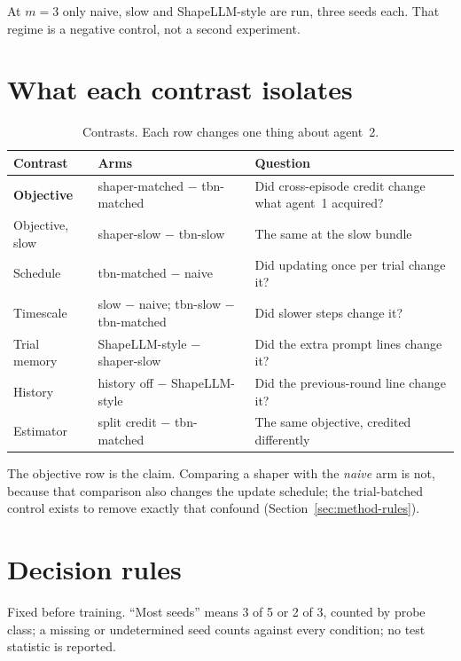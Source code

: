 At \(m=3\) only naive, slow and ShapeLLM-style are run, three seeds each.
That regime is a negative control, not a second experiment.

\section{What each contrast isolates}
\label{sec:contrasts}

\begin{table}[ht]
\centering\small
\caption{Contrasts. Each row changes one thing about agent~2.}
\label{tab:contrasts}
\begin{tabularx}{\textwidth}{>{\raggedright\arraybackslash}p{3.4cm}>{\raggedright\arraybackslash}p{5.2cm}X}
\toprule
Contrast & Arms & Question \\
\midrule
\textbf{Objective} & shaper-matched \(-\) tbn-matched & Did cross-episode credit change what agent~1 acquired? \\
Objective, slow & shaper-slow \(-\) tbn-slow & The same at the slow bundle \\
Schedule & tbn-matched \(-\) naive & Did updating once per trial change it? \\
Timescale & slow \(-\) naive; tbn-slow \(-\) tbn-matched & Did slower steps change it? \\
Trial memory & ShapeLLM-style \(-\) shaper-slow & Did the extra prompt lines change it? \\
History & history off \(-\) ShapeLLM-style & Did the previous-round line change it? \\
Estimator & split credit \(-\) tbn-matched & The same objective, credited differently \\
\bottomrule
\end{tabularx}
\end{table}

The objective row is the claim.
Comparing a shaper with the \emph{naive} arm is not, because that comparison
also changes the update schedule; the trial-batched control exists to remove
exactly that confound (Section~\ref{sec:method-rules}).

\section{Decision rules}
\label{sec:decide}

Fixed before training.
``Most seeds'' means 3 of 5 or 2 of 3, counted by probe class; a missing or
undetermined seed counts against every condition; no test statistic is
reported.

